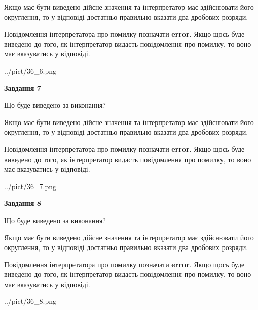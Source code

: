 \documentclass[12pt, ukrainian]{article}
\begin{document}
{\begin {Large}
Якщо має бути виведено дійсне значення та інтерпретатор має здійснювати його округлення, 
то у відповіді достатньо правильно вказати два дробових розряди.

Повідомлення інтерпретатора про помилку позначати \textbf{error}.
Якщо щось буде виведено до того, як інтерпретатор видасть повідомлення про помилку, 
то воно має вказуватись у відповіді. \par

\begin{center}
	{../pict/36_6.png}
\end{center}
\newpage

{\begin {center}\textbf{Завдання 7}\end {center}}\par
Що буде виведено за виконання? \par

Якщо має бути виведено дійсне значення та інтерпретатор має здійснювати його округлення, 
то у відповіді достатньо правильно вказати два дробових розряди.

Повідомлення інтерпретатора про помилку позначати \textbf{error}.
Якщо щось буде виведено до того, як інтерпретатор видасть повідомлення про помилку, 
то воно має вказуватись у відповіді. \par

\begin{center}
	{../pict/36_7.png}
\end{center}
\newpage

{\begin {center}\textbf{Завдання 8}\end {center}}\par
Що буде виведено за виконання? \par

Якщо має бути виведено дійсне значення та інтерпретатор має здійснювати його округлення, 
то у відповіді достатньо правильно вказати два дробових розряди.

Повідомлення інтерпретатора про помилку позначати \textbf{error}.
Якщо щось буде виведено до того, як інтерпретатор видасть повідомлення про помилку, 
то воно має вказуватись у відповіді. \par

\begin{center}
	{../pict/36_8.png}
\end{center}
\newpage


\end{Large}}
\end{document}
